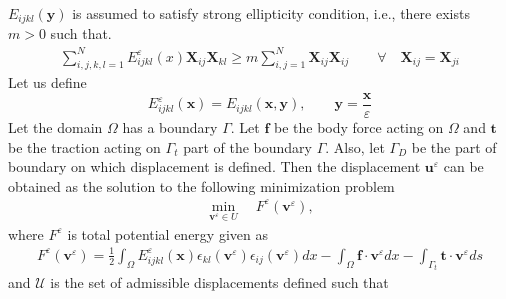 \documentclass[10pt]{article}
\newcommand{\e}[1]{\textbf{#1}}
\newcommand{\fj}[2]{\frac{\partial #1}{\partial #2}}
\begin{document}
$E_{ijkl}(\e y)$ is assumed to satisfy strong ellipticity condition, i.e., there exists $m>0$ such that.
\begin{gather}
\sum_{i,j,k,l=1}^N E_{ijkl}^\varepsilon(x)\textbf{X}_{ij}\textbf{X}_{kl}\geq m\sum_{i,j=1}^N\textbf{X}_{ij}\textbf{X}_{ij} \qquad \forall \quad \textbf{X}_{ij}=\textbf{X}_{ji}
\end{gather}
Let us define
\begin{equation}
E_{ijkl}^\varepsilon (\textbf{x}) = E_{ijkl}(\textbf{x},\textbf{y}), \qquad \textbf{y} = \frac{\textbf{x}}{\varepsilon}
\end{equation}
Let the domain $\Omega$ has a boundary $\Gamma$. Let $\textbf{f}$ be the body force acting on $\Omega$ and $\textbf{t}$ be the traction acting on $\Gamma_t$ part of the boundary $\Gamma$. Also, let $\Gamma_D$ be the part of boundary on which displacement is defined. Then the displacement $\textbf{u}^\varepsilon$ can be obtained as the solution to the following minimization problem
\begin{align}
\label{fem}
\min_{\textbf{v}^\varepsilon\in U} \quad F^\varepsilon(\textbf{v}^\varepsilon),
\end{align} 
where $F^\varepsilon$ is total potential energy given as	
\begin{eqnarray} \label{tpe}
F^\varepsilon(\textbf{v}^\varepsilon) = \frac{1}{2}\int_\Omega E^\varepsilon_{ijkl}(\e x)\epsilon_{kl}(\textbf{v}^\varepsilon)\epsilon_{ij}(\textbf{v}^\varepsilon)dx-\int_\Omega\textbf{f}\cdot\textbf{v}^\varepsilon dx - \int_{\Gamma_t}\textbf{t}\cdot\textbf{v}^\varepsilon ds
\end{eqnarray}
and $\mathcal{U}$ is the set of admissible displacements defined such that
\end{document}
